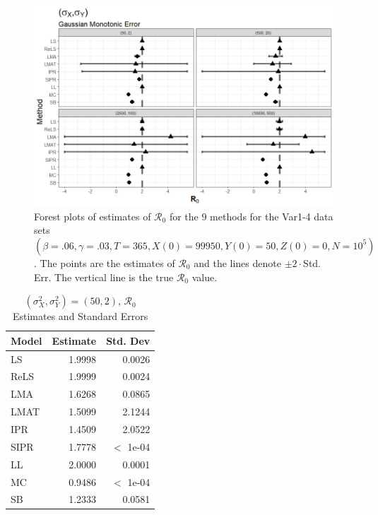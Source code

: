 \documentclass[12pt]{article}
\newcommand{\xxsir}{\ensuremath{9} } %
\newcommand{\rr}{\ensuremath{\mathcal{R}_0}}
\begin{document}
\begin{figure}[H]
	\begin{center}
		\includegraphics[scale=0.5]{images/var_nm.jpeg}
		\caption{Forest plots of estimates of $\rr$ for the \xxsir methods for the Var1-4 data sets $(\beta=.06, \gamma=.03, T=365, X(0)=99950, Y(0)=50, Z(0)=0, N=10^5)$.  The points are the estimates of $\rr$ and the lines denote $\pm 2\cdot $Std. Err.  The vertical line is the true $\rr$ value.}
	\end{center}
\end{figure}

\begin{table}[H]
	
	
	\centering
	\begin{tabular}[t]{l|r|r}
		\hline
		Model & Estimate & Std. Dev\\
		\hline
		LS & 1.9998 & 0.0026\\
		\hline
		ReLS & 1.9999 & 0.0024\\
		\hline
		LMA & 1.6268 & 0.0865\\
		\hline
		LMAT & 1.5099 & 2.1244\\
		\hline
		IPR & 1.4509 & 2.0522\\
		\hline
		SIPR & 1.7778 & $<$ 1e-04\\
		\hline
		LL & 2.0000 & 0.0001\\
		\hline
		MC & 0.9486 & $<$ 1e-04\\
		\hline
		SB & 1.2333 & 0.0581\\
		\hline
	\end{tabular}
	\caption{ $(\sigma^2_X, \sigma^2_Y) = (50, 2)$, $\rr$ Estimates and Standard Errors}
\end{table}
\end{document}
